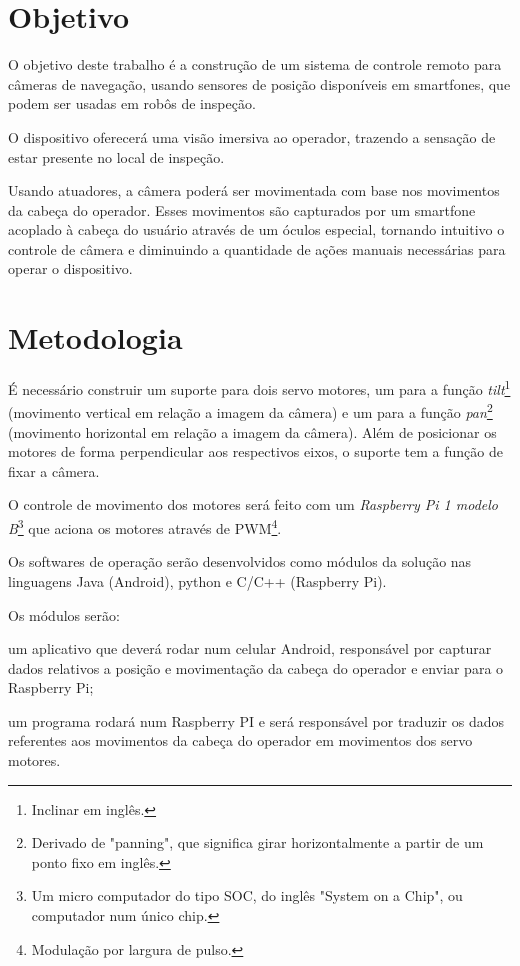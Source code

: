 \documentclass[12pt,a4paper]{article}
\begin{document}
\section{Objetivo}
	O objetivo deste trabalho é a construção de um sistema de controle remoto para câmeras de navegação, usando sensores de posição disponíveis em smartfones, que podem ser usadas em robôs de inspeção.\par
	O dispositivo oferecerá uma visão imersiva ao operador, trazendo a sensação de estar presente no local de inspeção.\par
	Usando atuadores, a câmera poderá ser movimentada com base nos movimentos da cabeça do operador. Esses movimentos são capturados por um smartfone acoplado à cabeça do usuário através de um óculos especial, tornando intuitivo o controle de câmera e diminuindo a quantidade de ações manuais necessárias para operar o dispositivo.

\section{Metodologia}
	É necessário construir um suporte para dois servo motores, um para a função \emph{tilt}\footnote{Inclinar em inglês.} (movimento vertical em relação a imagem da câmera) e um para a função \emph{pan}\footnote{Derivado de "panning", que significa girar horizontalmente a partir de um ponto fixo em inglês.} (movimento horizontal em relação a imagem da câmera). Além de posicionar os motores de forma perpendicular aos respectivos eixos, o suporte tem a função de fixar a câmera.\par
	O controle de movimento dos motores será feito com um \emph{Raspberry Pi 1 modelo B}\footnote{Um micro computador do tipo SOC, do inglês "System on a Chip", ou computador num único chip.} que aciona os motores através de PWM\footnote{Modulação por largura de pulso.}.\par
	Os softwares de operação serão desenvolvidos como módulos da solução nas linguagens Java (Android), python e C/C++ (Raspberry Pi).\par
	Os módulos serão: \begin{enumerate*} \item um aplicativo que deverá rodar num celular Android, responsável por capturar dados relativos a posição e movimentação da cabeça do operador e enviar para o Raspberry Pi; \item um programa rodará num Raspberry PI e será responsável por traduzir os dados referentes aos movimentos da cabeça do operador em movimentos dos servo motores.\end{enumerate*}\par
\end{document}
